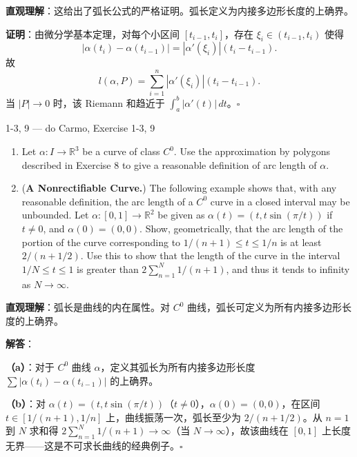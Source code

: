 \begin{solution}
\textbf{直观理解}：这给出了弧长公式的严格证明。弧长定义为内接多边形长度的上确界。

\textbf{证明}：由微分学基本定理，对每个小区间 $[t_{i-1}, t_i]$，存在 $\xi_i \in (t_{i-1}, t_i)$ 使得
\[
|\alpha(t_i) - \alpha(t_{i-1})| = |\alpha'(\xi_i)|(t_i - t_{i-1}).
\]
故
\[
l(\alpha, P) = \sum_{i=1}^n |\alpha'(\xi_i)|(t_i - t_{i-1}).
\]
当 $|P| \to 0$ 时，该 Riemann 和趋近于 $\int_a^b |\alpha'(t)|\, dt$。$\square$
\end{solution}

\begin{exercise}{1-3, 9 — do Carmo, Exercise 1-3, 9}
\begin{enumerate}
\item[a.] Let $\alpha: I \to \mathbb{R}^3$ be a curve of class $C^0$. Use the approximation by polygons described in Exercise 8 to give a reasonable definition of arc length of $\alpha$.

\item[b.] (\textbf{A Nonrectifiable Curve.}) The following example shows that, with any reasonable definition, the arc length of a $C^0$ curve in a closed interval may be unbounded. Let $\alpha: [0,1] \to \mathbb{R}^2$ be given as $\alpha(t) = (t, t\sin(\pi/t))$ if $t \neq 0$, and $\alpha(0) = (0,0)$. Show, geometrically, that the arc length of the portion of the curve corresponding to $1/(n+1) \leq t \leq 1/n$ is at least $2/(n + 1/2)$. Use this to show that the length of the curve in the interval $1/N \leq t \leq 1$ is greater than $2\sum_{n=1}^N 1/(n+1)$, and thus it tends to infinity as $N \to \infty$.
\end{enumerate}
\end{exercise}

\begin{solution}
\textbf{直观理解}：弧长是曲线的内在属性。对 $C^0$ 曲线，弧长可定义为所有内接多边形长度的上确界。

\textbf{解答}：

\textbf{（a）}：对于 $C^0$ 曲线 $\alpha$，定义其弧长为所有内接多边形长度 $\sum |\alpha(t_i) - \alpha(t_{i-1})|$ 的上确界。

\textbf{（b）}：对 $\alpha(t) = (t, t\sin(\pi/t))$（$t \neq 0$），$\alpha(0) = (0,0)$，在区间 $t \in [1/(n+1), 1/n]$ 上，曲线振荡一次，弧长至少为 $2/(n+1/2)$。从 $n=1$ 到 $N$ 求和得 $2\sum_{n=1}^N 1/(n+1) \to \infty$（当 $N \to \infty$），故该曲线在 $[0,1]$ 上长度无界——这是不可求长曲线的经典例子。$\square$
\end{solution}

